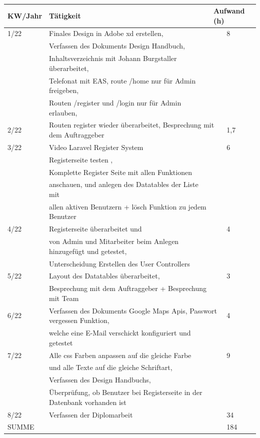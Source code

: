 \begin{table}[h]
	\caption{}
	\label{tab:my-table}
	\begin{tabular}{|l|lll|}
		\hline
		KW/Jahr &
		\multicolumn{1}{l|}{Tätigkeit} &
		\multicolumn{2}{l|}{Aufwand (h)} \\ \hline

		1/22 &
		\multicolumn{2}{l|}{Finales Design in Adobe xd erstellen,   } &
		8 \\&Verfassen des Dokuments Design Handbuch,\\&Inhaltsverzeichnis mit Johann Burgstaller überarbeitet,\\ &Telefonat mit EAS, route /home nur für Admin freigeben,\\& Routen /register und /login nur für Admin erlauben,\\\hline
		2/22 &
		\multicolumn{2}{l|}{Routen register wieder überarbeitet, Besprechung mit dem Auftraggeber} &
		1,7 \\ \hline
		3/22 &
		\multicolumn{2}{l|}{Video Laravel Register System  } &
		6 \\& Registerseite testen ,\\ & Komplette Register Seite mit allen Funktionen\\&anschauen, und anlegen des Datatables der Liste mit\\&allen aktiven Benutzern + lösch Funktion zu jedem Benutzer\\\hline
		4/22 &
		\multicolumn{2}{l|}{Registerseite überarbeitet und } &
		4 \\ & von Admin und Mitarbeiter beim Anlegen hinzugefügt und getestet,\\&Unterscheidung Erstellen des User Controllers\\\hline
		5/22 &
		\multicolumn{2}{l|}{Layout des Datatables überarbeitet, } &
		3 \\ &Besprechung mit dem Auftraggeber + Besprechung mit Team\\\hline
		6/22 &
		\multicolumn{2}{l|}{Verfassen des Dokuments Google Maps Apis, Passwort vergessen Funktion, } &
		4 \\ &welche eine E-Mail verschickt konfiguriert und getestet\\\hline
		7/22 &
		\multicolumn{2}{l|}{Alle css Farben anpassen auf die gleiche Farbe   } &
		9 \\ &und alle Texte auf die gleiche Schriftart,\\&Verfassen des Design Handbuchs,\\&Überprüfung, ob Benutzer bei Registerseite in der Datenbank vorhanden ist\\\hline
		8/22 &
		\multicolumn{2}{l|}{Verfassen der Diplomarbeit} &
		34 \\ \hline
		 SUMME &
		\multicolumn{2}{l|}{} &
		184 \\ \hline
	\end{tabular}
\end{table}



